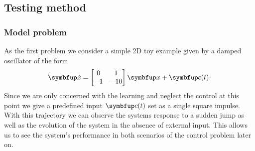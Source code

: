 \subsection{Testing method}
\subsubsection{Model problem}
As the first problem we consider a simple 2D toy example given by a damped oscillator of the form
\begin{equation}\label{eq:toy_example}
	\bmu{\dot{x}} = \begin{bmatrix}
	0&1\\ -1 &-10
	\end{bmatrix}\bmu{x} + \bmu{c}(t).
\end{equation}
Since we are only concerned with the learning and neglect the control at this point we give a predefined input $\bmu{c}(t)$ set as a single square impulse. With this trajectory we can observe the systems response to a sudden jump as well as the evolution of the system in the absence of external input. This allows us to see the system's performance in both scenarios of the control problem later on.


